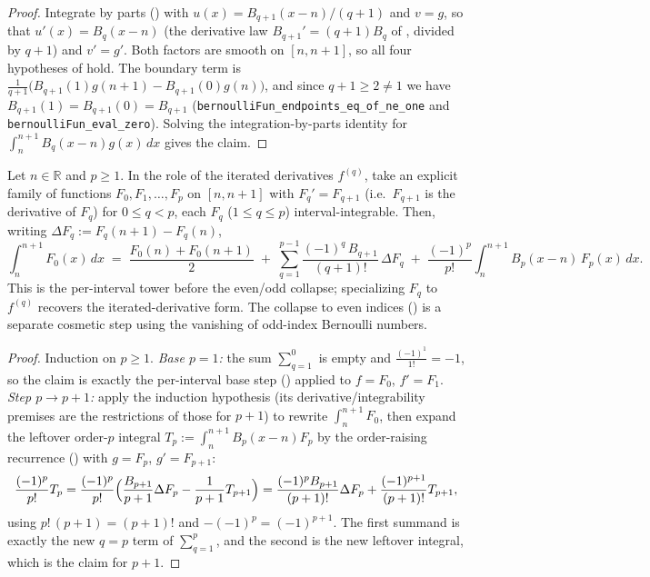 \begin{proof}
\leanok
{}
Integrate by parts () with $u(x)=B_{q+1}(x-n)/(q+1)$ and $v=g$, so
that $u'(x)=B_q(x-n)$ (the derivative law $B_{q+1}'=(q+1)B_q$ of
, divided by $q+1$) and $v'=g'$. Both factors are smooth on
$[n,n+1]$, so all four hypotheses of  hold. The boundary term is
$\tfrac1{q+1}\bigl(B_{q+1}(1)g(n+1)-B_{q+1}(0)g(n)\bigr)$, and since $q+1 \ge 2 \neq 1$
we have $B_{q+1}(1)=B_{q+1}(0)=B_{q+1}$
(\texttt{bernoulliFun\_endpoints\_eq\_of\_ne\_one} and
\texttt{bernoulliFun\_eval\_zero}). Solving the integration-by-parts identity for
$\int_n^{n+1}B_q(x-n)g(x)\,dx$ gives the claim.
\end{proof}

\begin{lemma}
\label{lem:em_unit_tower_raw}
\leanok
{}
Let $n \in \mathbb{R}$ and $p \ge 1$. In the role of the iterated derivatives
$f^{(q)}$, take an explicit family of functions $F_0, F_1, \dots, F_p$ on
$[n,n+1]$ with $F_q' = F_{q+1}$ (i.e.\ $F_{q+1}$ is the derivative of $F_q$) for
$0 \le q < p$, each $F_q$ ($1 \le q \le p$) interval-integrable. Then, writing
$\Delta F_q := F_q(n+1) - F_q(n)$,
\[
  \int_n^{n+1} F_0(x)\,dx
  \;=\; \frac{F_0(n)+F_0(n+1)}{2}
      \;+\; \sum_{q=1}^{p-1} \frac{(-1)^{q}\,B_{q+1}}{(q+1)!}\,\Delta F_q
      \;+\; \frac{(-1)^{p}}{p!}\int_n^{n+1} B_p(x-n)\, F_p(x)\,dx .
\]
This is the per-interval tower before the even/odd collapse; specializing $F_q$ to
$f^{(q)}$ recovers the iterated-derivative form. The collapse to even indices
() is a separate cosmetic step using the vanishing of
odd-index Bernoulli numbers.
\end{lemma}

\begin{proof}
\leanok
{}
Induction on $p \ge 1$. \emph{Base $p = 1$:} the sum $\sum_{q=1}^{0}$ is empty and
$\tfrac{(-1)^1}{1!} = -1$, so the claim is exactly the per-interval base step
() applied to $f = F_0$, $f' = F_1$. \emph{Step
$p \to p+1$:} apply the induction hypothesis (its derivative/integrability premises
are the restrictions of those for $p+1$) to rewrite $\int_n^{n+1}F_0$, then expand the
leftover order-$p$ integral $T_p := \int_n^{n+1} B_p(x-n)F_p$ by the order-raising
recurrence () with $g = F_p$, $g' = F_{p+1}$:
\[
  \frac{(-1)^p}{p!}T_p
  = \frac{(-1)^p}{p!}\Bigl(\frac{B_{p+1}}{p+1}\Delta F_p - \frac{1}{p+1}T_{p+1}\Bigr)
  = \frac{(-1)^p B_{p+1}}{(p+1)!}\Delta F_p + \frac{(-1)^{p+1}}{(p+1)!}T_{p+1},
\]
using $p!\,(p+1) = (p+1)!$ and $-(-1)^p = (-1)^{p+1}$. The first summand is exactly the
new $q = p$ term of $\sum_{q=1}^{p}$, and the second is the new leftover integral, which
is the claim for $p+1$.
\end{proof}

